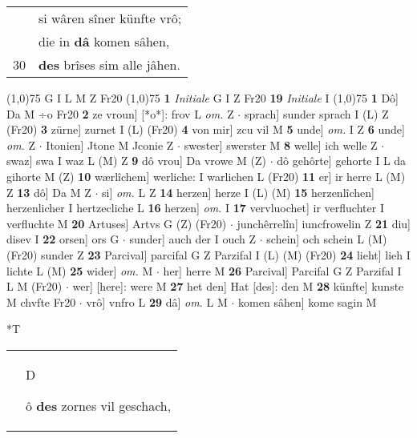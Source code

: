 \documentclass[8pt,a4paper,notitlepage]{article}
\begin{document}
\begin{table}[ht]
\begin{minipage}[t]{0.5\linewidth}
\begin{tabular}{rl}
 & si wâren sîner künfte vrô;\\ 
 & die in \textbf{dâ} komen sâhen,\\ 
30 & \textbf{des} brîses sim alle jâhen.\\ 
\end{tabular}
\scriptsize
\line(1,0){75} \newline
G I L M Z Fr20 \newline
\line(1,0){75} \newline
\textbf{1} \textit{Initiale} G I Z Fr20  \textbf{19} \textit{Initiale} I  \newline
\line(1,0){75} \newline
\textbf{1} Dô] Da M ÷o Fr20 \textbf{2} ze vroun] [*o*]: frov L \textit{om.} Z  $\cdot$ sprach] sunder sprach I (L) Z (Fr20) \textbf{3} zürne] zurnet I (L) (Fr20) \textbf{4} von mir] zcu vil M \textbf{5} unde] \textit{om.} I Z \textbf{6} unde] \textit{om.} Z  $\cdot$ Itonien] Jtone M Jconie Z  $\cdot$ swester] swerster M \textbf{8} welle] ich welle Z  $\cdot$ swaz] swa I waz L (M) Z \textbf{9} dô vrou] Da vrowe M (Z)  $\cdot$ dô gehôrte] gehorte I L da gihorte M (Z) \textbf{10} wærlîchem] werliche: I warlichen L (Fr20) \textbf{11} er] ir herre L (M) Z \textbf{13} dô] Da M Z  $\cdot$ si] \textit{om.} L Z \textbf{14} herzen] herze I (L) (M) \textbf{15} herzenlîchen] herzenlicher I hertzecliche L \textbf{16} herzen] \textit{om.} I \textbf{17} vervluochet] ir verfluchter I verfluchte M \textbf{20} Artuses] Artvs G (Z) (Fr20)  $\cdot$ junchêrrelîn] iuncfrowelin Z \textbf{21} diu] disev I \textbf{22} orsen] ors G  $\cdot$ sunder] auch der I ouch Z  $\cdot$ schein] och schein L (M) (Fr20) sunder Z \textbf{23} Parcival] parcifal G Z Parzifal I (L) (M) (Fr20) \textbf{24} lieht] lieh I lichte L (M) \textbf{25} wider] \textit{om.} M  $\cdot$ her] herre M \textbf{26} Parcival] Parcifal G Z Parzifal I L M (Fr20)  $\cdot$ wer] [here]: were M \textbf{27} het den] Hat [des]: den M \textbf{28} künfte] kunste M chvfte Fr20  $\cdot$ vrô] vnfro L \textbf{29} dâ] \textit{om.} L M  $\cdot$ komen sâhen] kome sagin M \newline
\end{minipage}
\hspace{0.5cm}
\begin{minipage}[t]{0.5\linewidth}
\small
\begin{center}*T
\end{center}
\begin{tabular}{rl}
 & \begin{large}D\end{large}ô \textbf{des} zornes vil geschach,\\ 

\end{tabular}
\end{minipage}
\end{table}
\end{document}
